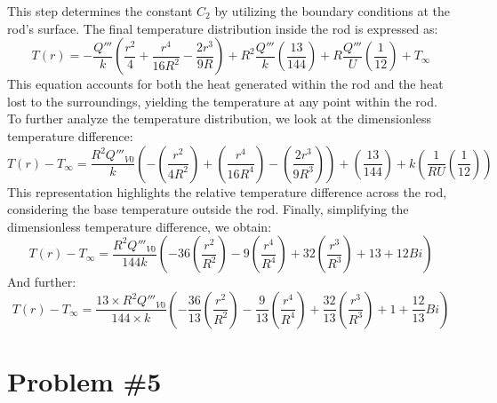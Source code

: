 \documentclass{article}
\numberwithin{equation}{section}
\begin{document}
\noindent
This step determines the constant \(C_2\) by utilizing the boundary conditions at the rod's surface. The final temperature distribution inside the rod is expressed as:
\begin{equation}
T(r) = -\frac{Q'''}{k} \left( \frac{r^2}{4} + \frac{r^4}{16R^2} - \frac{2r^3}{9R} \right) + R^2 \frac{Q'''}{k} \left( \frac{13}{144} \right) + R \frac{Q'''}{U} \left( \frac{1}{12} \right) + T_{\infty}
\end{equation}
\noindent
This equation accounts for both the heat generated within the rod and the heat lost to the surroundings, yielding the temperature at any point within the rod. To further analyze the temperature distribution, we look at the dimensionless temperature difference:
\begin{equation}
T(r) - T_{\infty} = \frac{R^2 Q'''_{V0}}{k} \left( -\left(\frac{r^2}{4R^2}\right) + \left(\frac{r^4}{16R^4}\right) - \left(\frac{2r^3}{9R^3}\right) \right) + \left(\frac{13}{144}\right) + k \left(\frac{1}{RU}\left(\frac{1}{12}\right)\right)
\end{equation}
\noindent
This representation highlights the relative temperature difference across the rod, considering the base temperature outside the rod. Finally, simplifying the dimensionless temperature difference, we obtain:
\begin{equation}
T(r) - T_{\infty} = \frac{R^2 Q'''_{V0}}{144 k} \left( -36\left(\frac{r^2}{R^2}\right) - 9\left(\frac{r^4}{R^4}\right) + 32\left(\frac{r^3}{R^3}\right) + 13 + 12Bi \right)
\end{equation}
\noindent
And further:
\begin{equation}
T(r) - T_{\infty} = \frac{13 \times R^2 Q'''_{V0}}{144 \times k} \left( -\frac{36}{13}\left(\frac{r^2}{R^2}\right) - \frac{9}{13}\left(\frac{r^4}{R^4}\right) + \frac{32}{13}\left(\frac{r^3}{R^3}\right) + 1 + \frac{12}{13}Bi \right)
\end{equation}

\newpage
\section{Problem \#5}
\end{document}
